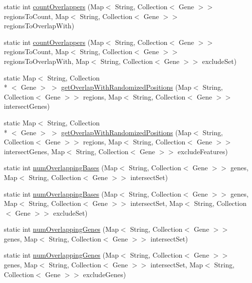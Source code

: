 \begin{DoxyCompactItemize}
\item 
static int \hyperlink{classbroad_1_1core_1_1overlaputils_1_1_gene_set_intersect_af100c23d53648e28a28c44a0f39f7793}{count\+Overlappers} (Map$<$ String, Collection$<$ Gene $>$$>$ regions\+To\+Count, Map$<$ String, Collection$<$ Gene $>$$>$ regions\+To\+Overlap\+With)
\item 
static int \hyperlink{classbroad_1_1core_1_1overlaputils_1_1_gene_set_intersect_a8fdf9a00a09d928137c033175041c778}{count\+Overlappers} (Map$<$ String, Collection$<$ Gene $>$$>$ regions\+To\+Count, Map$<$ String, Collection$<$ Gene $>$$>$ regions\+To\+Overlap\+With, Map$<$ String, Collection$<$ Gene $>$$>$ exclude\+Set)
\item 
static Map$<$ String, Collection\\*
$<$ Gene $>$ $>$ \hyperlink{classbroad_1_1core_1_1overlaputils_1_1_gene_set_intersect_ac93739572a200cb1ab294d3145f1e902}{get\+Overlap\+With\+Randomized\+Positions} (Map$<$ String, Collection$<$ Gene $>$$>$ regions, Map$<$ String, Collection$<$ Gene $>$$>$ intersect\+Genes)
\item 
static Map$<$ String, Collection\\*
$<$ Gene $>$ $>$ \hyperlink{classbroad_1_1core_1_1overlaputils_1_1_gene_set_intersect_a00354a59179e3fc2e4577537942db2e0}{get\+Overlap\+With\+Randomized\+Positions} (Map$<$ String, Collection$<$ Gene $>$$>$ regions, Map$<$ String, Collection$<$ Gene $>$$>$ intersect\+Genes, Map$<$ String, Collection$<$ Gene $>$$>$ exclude\+Features)
\item 
static int \hyperlink{classbroad_1_1core_1_1overlaputils_1_1_gene_set_intersect_a0d7c1260e14a6fccb8fbb735f30a0fce}{num\+Overlapping\+Bases} (Map$<$ String, Collection$<$ Gene $>$$>$ genes, Map$<$ String, Collection$<$ Gene $>$$>$ intersect\+Set)
\item 
static int \hyperlink{classbroad_1_1core_1_1overlaputils_1_1_gene_set_intersect_adf8ca4370f3a6d8b211126f85d865a7b}{num\+Overlapping\+Bases} (Map$<$ String, Collection$<$ Gene $>$$>$ genes, Map$<$ String, Collection$<$ Gene $>$$>$ intersect\+Set, Map$<$ String, Collection$<$ Gene $>$$>$ exclude\+Set)
\item 
static int \hyperlink{classbroad_1_1core_1_1overlaputils_1_1_gene_set_intersect_a1722a4a5c4eb60dd7ed6d634f41cf1b9}{num\+Overlapping\+Genes} (Map$<$ String, Collection$<$ Gene $>$$>$ genes, Map$<$ String, Collection$<$ Gene $>$$>$ intersect\+Set)
\item 
static int \hyperlink{classbroad_1_1core_1_1overlaputils_1_1_gene_set_intersect_ada0235bbe25a54918f63ab212d13a6ac}{num\+Overlapping\+Genes} (Map$<$ String, Collection$<$ Gene $>$$>$ genes, Map$<$ String, Collection$<$ Gene $>$$>$ intersect\+Set, Map$<$ String, Collection$<$ Gene $>$$>$ exclude\+Genes)

\end{DoxyCompactItemize}
